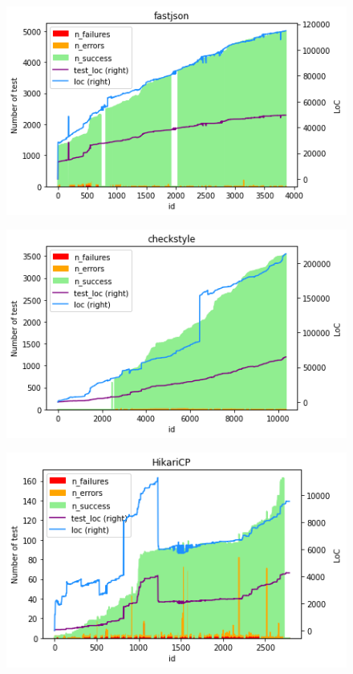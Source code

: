 \begin{figure}[!htb]
    \centering
    \begin{minipage}{.5\linewidth}
        \centering
        \includegraphics[width=\textwidth]{pages/02-Testability/images/projects/fastjson.png}
        \label{fig:fastjson}
    \end{minipage}%
    \begin{minipage}{.5\linewidth}
        \centering
        \includegraphics[width=\textwidth]{pages/02-Testability/images/projects/checkstyle.png}
        \label{fig:checkstyle}
    \end{minipage}
    \begin{minipage}{.5\linewidth}
        \centering
        \includegraphics[width=\textwidth]{pages/02-Testability/images/projects/hikari.png}

\end{minipage}
\end{figure}
